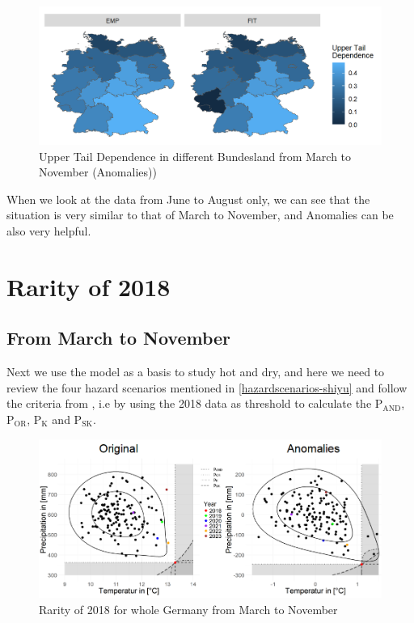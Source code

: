 \documentclass[
]{krantz}
\begin{document}
\begin{figure}

{\centering \includegraphics[width=0.8\linewidth]{work/03-compounds/figures/UTDMAP/anomalies} 

}

\caption{Upper Tail Dependence in different Bundesland from March to November (Anomalies))}\label{fig:utdmap2-shiyu}
\end{figure}

When we look at the data from June to August only, we can see that the situation is very similar to that of March to November, and Anomalies can be also very helpful.

\section{Rarity of 2018}\label{rarity-shiyu}

\subsection{From March to November}\label{MN-shiyu}

Next we use the model as a basis to study hot and dry, and here we need to review the four hazard scenarios mentioned in \ref{hazardscenarios-shiyu} and follow the criteria from \citet{zscheischler2020}, i.e by using the 2018 data as threshold to calculate the \(\text{P}_\text{AND}\), \(\text{P}_\text{OR}\), \(\text{P}_\text{K}\) and \(\text{P}_\text{SK}\).

\begin{figure}

{\centering \includegraphics[width=0.8\linewidth]{work/03-compounds/figures/RESULTS/resultallMtoN} 

}

\caption{Rarity of 2018 for whole Germany from March to November}\label{fig:result1-shiyu}
\end{figure}
\end{document}
